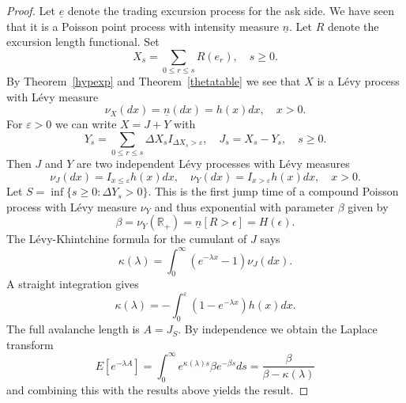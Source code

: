 \documentclass[11pt]{scrartcl}
\newcommand{\nbid}{\underline{n}}
\newcommand{\ebid}{\underline{e}}
\begin{document}
\begin{proof}
Let $\ebid$ denote the trading excursion process for the ask side.
We have seen that it is a Poisson point process with intensity measure
$\nbid$. Let $R$ denote the excursion length functional.
Set
\begin{equation}
X_s=\sum_{0\leq r\leq s}R(e_r),\quad s\geq0.
\end{equation}
By Theorem~\ref{hypexp} and Theorem~\ref{thetatable} we see that $X$ is a L\'evy process with L\'evy measure
\begin{equation}
\nu_X(dx)=\nbid(dx) = h(x)dx,\quad x>0.
\end{equation}
For $\varepsilon>0$ we can write $X=J+Y$ with
\begin{equation}
Y_s=\sum_{0\leq r\leq s}\Delta X_sI_{\Delta X_s>\varepsilon},\quad
J_s=X_s-Y_s,\quad s\geq0.
\end{equation}
Then $J$ and $Y$ are two independent L\'evy processes with L\'evy measures
\begin{equation}
\nu_J(dx)=I_{x\leq\varepsilon}h(x)dx,\quad
\nu_Y(dx)=I_{x>\varepsilon}h(x)dx,
\quad x>0.
\end{equation}
Let $S=\inf\{s\geq0:\Delta Y_s>0\}$.
This is the first jump time of a compound Poisson process with L\'evy measure
$\nu_Y$ and thus exponential with parameter $\beta$ given by
\begin{equation}
  \beta=\nu_Y(\mathbb R_+)=\nbid[R>\epsilon]=H(\epsilon).
\end{equation}
The L\'evy-Khintchine formula for the cumulant of $J$ says
\begin{equation}
\kappa(\lambda)=\int_0^\infty(e^{-\lambda x}-1)\nu_J(dx).
\end{equation}
A straight integration gives
\begin{equation}
\kappa(\lambda)=-\int_0^\varepsilon(1-e^{-\lambda x})h(x)dx.
\end{equation}
The full avalanche length is $A=J_S$. By independence we obtain the Laplace transform
\begin{equation}
E[e^{-\lambda A}]=
\int_0^\infty e^{\kappa(\lambda)s}\beta e^{-\beta s}ds=\frac{\beta}{\beta-\kappa(\lambda)}
\end{equation}
and combining this with the results above yields the result.
\end{proof}
\end{document}
